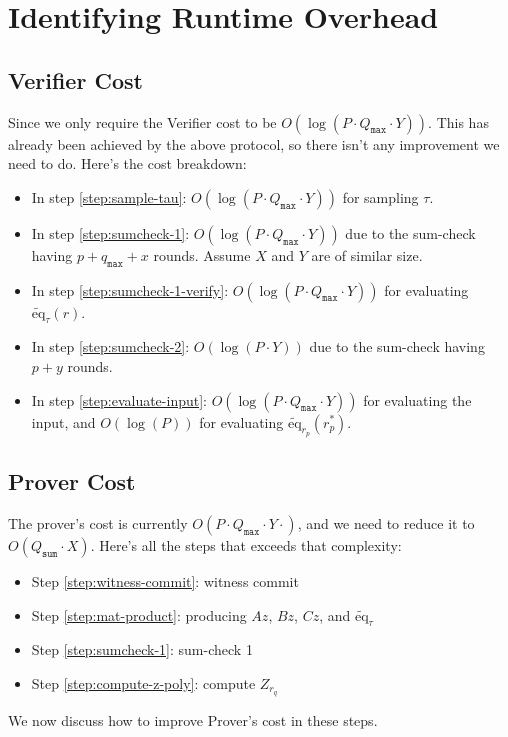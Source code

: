 \documentclass{article}
\newcommand{\Qsum}{Q_{\mathtt{sum}}}
\newcommand{\Qmax}{Q_{\mathtt{max}}}
\newcommand{\qmax}{q_{\mathtt{max}}}
\newcommand{\eq}{\widetilde{\mbox{eq}}}
\begin{document}
\section{Identifying Runtime Overhead}\label{identify}
\subsection{Verifier Cost}
Since we only require the Verifier cost to be $O(\log(P \cdot \Qmax \cdot Y))$. This has already been achieved by the above protocol, so there isn't any improvement we need to do. Here's the cost breakdown:
\begin{itemize}
    \item In step \ref{step:sample-tau}: $O(\log(P \cdot \Qmax \cdot Y))$ for sampling $\tau$.
    \item In step \ref{step:sumcheck-1}: $O(\log(P \cdot \Qmax \cdot Y))$ due to the sum-check having $p + \qmax + x$ rounds. Assume $X$ and $Y$ are of similar size.
    \item In step \ref{step:sumcheck-1-verify}: $O(\log(P \cdot \Qmax \cdot Y))$ for evaluating $\eq_\tau(r)$.
    \item In step \ref{step:sumcheck-2}: $O(\log(P \cdot Y))$ due to the sum-check having $p + y$ rounds.
    \item In step \ref{step:evaluate-input}: $O(\log(P \cdot \Qmax \cdot Y))$ for evaluating the input, and $O(\log(P))$ for evaluating $\eq_{r_p}(r_p^*)$.
\end{itemize}

\subsection{Prover Cost}
The prover's cost is currently $O(P\cdot\Qmax\cdot Y\cdot)$, and we need to reduce it to $O(\Qsum \cdot X)$. Here's all the steps that exceeds that complexity:
\begin{itemize}
    \item Step \ref{step:witness-commit}: witness commit
    \item Step \ref{step:mat-product}: producing $Az$, $Bz$, $Cz$, and $\eq_\tau$
    \item Step \ref{step:sumcheck-1}: sum-check 1
    \item Step \ref{step:compute-z-poly}: compute $Z_{r_q}$
\end{itemize}
We now discuss how to improve Prover's cost in these steps.
\end{document}
